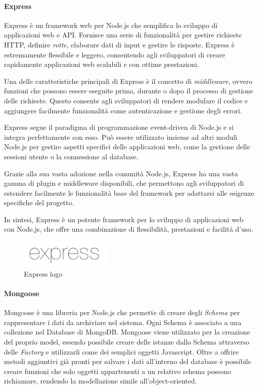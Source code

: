 \paragraph{Express}
Express è un framework web per Node.js che semplifica lo sviluppo di applicazioni web e API. Fornisce una serie di funzionalità per gestire richieste HTTP, definire \emph{rotte}, elaborare dati di input e gestire le risposte. Express è estremamente flessibile e leggero, consentendo agli sviluppatori di creare rapidamente applicazioni web scalabili e con ottime prestazioni.

Una delle caratteristiche principali di Express è il concetto di \emph{middleware}, ovvero funzioni che possono essere eseguite prima, durante o dopo il processo di gestione delle richieste. Questo consente agli sviluppatori di rendere modulare il codice e aggiungere facilmente funzionalità come autenticazione e gestione degli errori.

Express segue il paradigma di programmazione event-driven di Node.js e si integra perfettamente con esso. Può essere utilizzato insieme ad altri moduli Node.js per gestire aspetti specifici delle applicazioni web, come la gestione delle sessioni utente o la connessione al database.

Grazie alla sua vasta adozione nella comunità Node.js, Express ha una vasta gamma di plugin e middleware disponibili, che permettono agli sviluppatori di estendere facilmente le funzionalità base del framework per adattarsi alle esigenze specifiche del progetto.

In sintesi, Express è un potente framework per lo sviluppo di applicazioni web con Node.js, che offre una combinazione di flessibilità, prestazioni e facilità d'uso.

\begin{figure}[H]
\centering
\includegraphics[width=0.4\textwidth]{img/logos/expressjs_logo.png}
\caption{Express logo}
\label{fig:express}
\end{figure}

\paragraph{Mongoose}
Mongoose è una libreria per Node.js che permette di creare degli \emph{Schema} per rappresentare i dati da archiviare nel sistema.
Ogni Schema è associato a una collezione nel Database di MongoDB.
Mongoose viene utilizzato per la creazione del proprio model, essendo possibile creare delle istanze dallo Schema attraverso delle \emph{Factory} e utilizzarli come dei semplici oggetti Javascript.
Oltre a offrire metodi aggiuntivi già pronti per salvare i dati all'interno del database è possibile creare funzioni che solo oggetti appartenenti a un relativo schema possono richiamare, rendendo la modellazione simile all'object-oriented.

